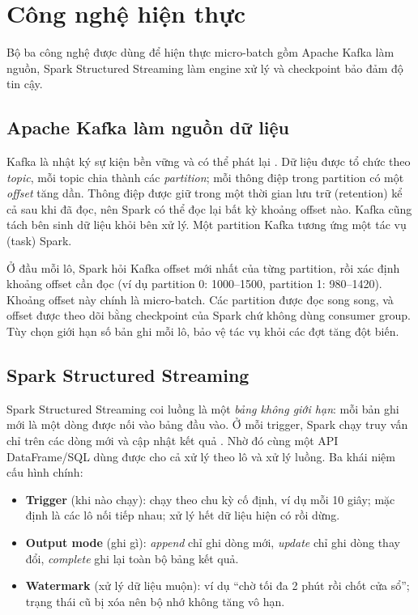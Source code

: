 \section{Công nghệ hiện thực}
\label{sec:2-tech}

Bộ ba công nghệ được dùng để hiện thực micro-batch gồm Apache Kafka làm nguồn, Spark Structured Streaming làm engine xử lý và checkpoint bảo đảm độ tin cậy.

\subsection{Apache Kafka làm nguồn dữ liệu}
\label{sec:2-kafka}

Kafka là nhật ký sự kiện bền vững và có thể phát lại \cite{kafka_docs}. Dữ liệu được tổ chức theo \emph{topic}, mỗi topic chia thành các \emph{partition}; mỗi thông điệp trong partition có một \emph{offset} tăng dần. Thông điệp được giữ trong một thời gian lưu trữ (retention) kể cả sau khi đã đọc, nên Spark có thể đọc lại bất kỳ khoảng offset nào. Kafka cũng tách bên sinh dữ liệu khỏi bên xử lý. Một partition Kafka tương ứng một tác vụ (task) Spark.

Ở đầu mỗi lô, Spark hỏi Kafka offset mới nhất của từng partition, rồi xác định khoảng offset cần đọc (ví dụ partition 0: 1000--1500, partition 1: 980--1420). Khoảng offset này chính là micro-batch. Các partition được đọc song song, và offset được theo dõi bằng checkpoint của Spark chứ không dùng consumer group. Tùy chọn  giới hạn số bản ghi mỗi lô, bảo vệ tác vụ khỏi các đợt tăng đột biến.

\subsection{Spark Structured Streaming}
\label{sec:2-spark}

Spark Structured Streaming coi luồng là một \emph{bảng không giới hạn}: mỗi bản ghi mới là một dòng được nối vào bảng đầu vào. Ở mỗi trigger, Spark chạy truy vấn chỉ trên các dòng mới và cập nhật kết quả \cite{spark_ss}. Nhờ đó cùng một API DataFrame/SQL dùng được cho cả xử lý theo lô và xử lý luồng. Ba khái niệm cấu hình chính:

\begin{itemize}
  \item \textbf{Trigger} (khi nào chạy):  chạy theo chu kỳ cố định, ví dụ mỗi 10 giây; mặc định là các lô nối tiếp nhau;  xử lý hết dữ liệu hiện có rồi dừng.
  \item \textbf{Output mode} (ghi gì): \emph{append} chỉ ghi dòng mới, \emph{update} chỉ ghi dòng thay đổi, \emph{complete} ghi lại toàn bộ bảng kết quả.
  \item \textbf{Watermark} (xử lý dữ liệu muộn): ví dụ ``chờ tối đa 2 phút rồi chốt cửa sổ''; trạng thái cũ bị xóa nên bộ nhớ không tăng vô hạn.
\end{itemize}

